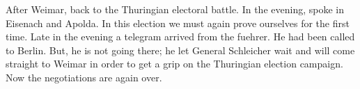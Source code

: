 After Weimar, back to the Thuringian electoral battle. In the evening, spoke in Eisenach and Apolda. In this election we must again prove ourselves for the first time. Late in the evening a telegram arrived from the fuehrer. He had been called to Berlin. But, he is not going there; he let General Schleicher wait and will come straight to Weimar in order to get a grip on the Thuringian election campaign. Now the negotiations are again over.